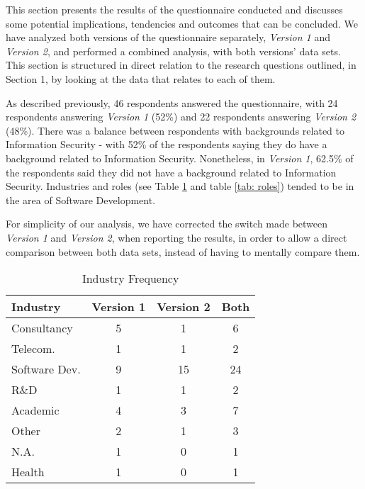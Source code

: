 This section presents the results of the questionnaire conducted and discusses some potential implications, tendencies and outcomes that can be concluded. We have analyzed both versions of the questionnaire separately, \textit{Version 1} and \textit{Version 2}, and performed a combined analysis, with both versions' data sets. This section is structured in direct relation to the research questions outlined, in Section 1, by looking at the data that relates to each of them.
  
As described previously, 46 respondents answered the questionnaire, with 24 respondents answering \textit{Version 1} (52\%) and 22 respondents answering \textit{Version 2} (48\%). There was a balance between respondents with backgrounds related to Information Security - with 52\% of the respondents saying they do have a background related to Information Security. Nonetheless, in \textit{Version 1}, 62.5\% of the respondents said they did not have a background related to Information Security. Industries and roles (see Table \ref{tab: industry} and table \ref{tab: roles}) tended to be in the area of Software Development.

For simplicity of our analysis, we have corrected the switch made between \textit{Version 1} and \textit{Version 2}, when reporting the results, in order to allow a direct comparison between both data sets, instead of having to mentally compare them.

\begin{table}[htb]
    \centering
    \caption{Industry Frequency}
    \label{tab: industry}
    \begin{tabular}{l|cc|c}
    \hline \bf Industry & \bf Version 1 & \bf Version 2  & \bf Both \\ \hline
    Consultancy   & 5 & 1  & 6  \\
    Telecom.     & 1 & 1  & 2  \\
    Software Dev. & 9 & 15 & 24 \\
    R\&D          & 1 & 1  & 2  \\
    Academic      & 4 & 3  & 7  \\
    Other         & 2 & 1  & 3  \\
    N.A.          & 1 & 0  & 1  \\
    Health        & 1 & 0  & 1  \\
    \hline
    \end{tabular}
\end{table}


